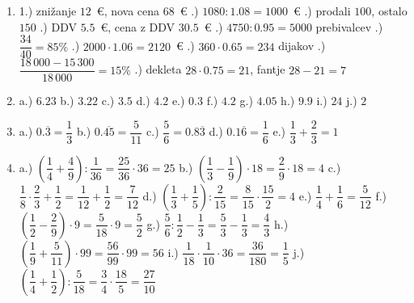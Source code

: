 \documentclass[a4paper,12pt]{letter}
\begin{document}
\begin{enumerate}
\item 1.) zni\v{z}anje $12$~\euro{}, nova cena $68$~\euro{} .) $1080:1.08=1000$~\euro{} .) prodali $100$, ostalo $150$ .) DDV $5.5$~\euro{}, cena z DDV $30.5$~\euro{} .) $4750:0.95=5000$ prebivalcev .) $\dfrac{34}{40}=85\%$ .) $2000\cdot1.06=2120$~\euro{} .) $360\cdot0.65=234$ dijakov .) $\dfrac{18\,000-15\,300}{18\,000}=15\%$ .) dekleta $28\cdot0.75=21$, fantje $28-21=7$

\item a.) $6.23$ \quad b.) $3.22$ \quad c.) $3.5$ \quad d.) $4.2$ \quad e.) $0.3$ \quad
      f.) $4.2$ \quad g.) $4.05$ \quad h.) $9.9$ \quad i.) $24$ \quad j.) $2$

\item a.) $0.\overline{3}=\dfrac{1}{3}$ \quad b.) $0.\overline{45}=\dfrac{5}{11}$ \quad
      c.) $\dfrac{5}{6}=0.8\overline{3}$ \quad d.) $0.1\overline{6}=\dfrac{1}{6}$ \quad
      e.) $\dfrac{1}{3}+\dfrac{2}{3}=1$

\item a.) $\left(\dfrac{1}{4}+\dfrac{4}{9}\right):\dfrac{1}{36}=\dfrac{25}{36}\cdot36=25$ \quad
      b.) $\left(\dfrac{1}{3}-\dfrac{1}{9}\right)\cdot18=\dfrac{2}{9}\cdot18=4$ \quad
      c.) $\dfrac{1}{8}\cdot\dfrac{2}{3}+\dfrac{1}{2}=\dfrac{1}{12}+\dfrac{1}{2}=\dfrac{7}{12}$ \quad
      d.) $\left(\dfrac{1}{3}+\dfrac{1}{5}\right):\dfrac{2}{15}=\dfrac{8}{15}\cdot\dfrac{15}{2}=4$ \quad
      e.) $\dfrac{1}{4}+\dfrac{1}{6}=\dfrac{5}{12}$ \quad
      f.) $\left(\dfrac{1}{2}-\dfrac{2}{9}\right)\cdot9=\dfrac{5}{18}\cdot9=\dfrac{5}{2}$ \quad
      g.) $\dfrac{5}{6}:\dfrac{1}{2}-\dfrac{1}{3}=\dfrac{5}{3}-\dfrac{1}{3}=\dfrac{4}{3}$ \quad
      h.) $\left(\dfrac{1}{9}+\dfrac{5}{11}\right)\cdot99=\dfrac{56}{99}\cdot99=56$ \quad
      i.) $\dfrac{1}{18}\cdot\dfrac{1}{10}\cdot36=\dfrac{36}{180}=\dfrac{1}{5}$ \quad
      j.) $\left(\dfrac{1}{4}+\dfrac{1}{2}\right):\dfrac{5}{18}=\dfrac{3}{4}\cdot\dfrac{18}{5}=\dfrac{27}{10}$
\end{enumerate}
\end{document}
